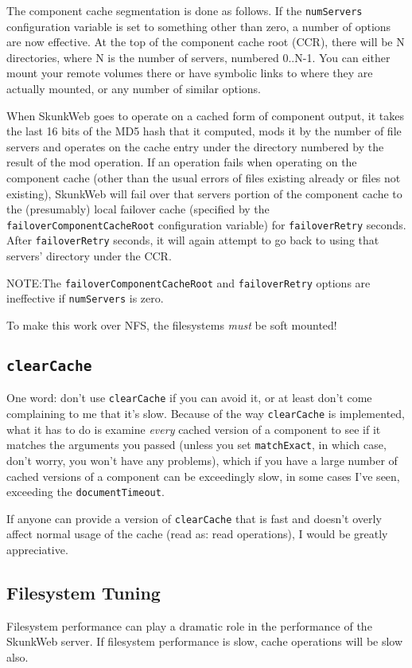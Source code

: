 \documentclass[titlepage]{manual}
\begin{document}
The component cache segmentation is done as follows. If the \texttt{numServers}
configuration variable is set to something other than zero, a number
of options are now effective. At the top of the component cache root
(CCR), there will be N directories, where N is the number of servers,
numbered 0..N-1. You can either mount your remote volumes there or
have symbolic links to where they are actually mounted, or any number
of similar options.
   
When SkunkWeb goes to operate on a cached form of component output, it
takes the last 16 bits of the MD5 hash that it computed, mods it by
the number of file servers and operates on the cache entry under the
directory numbered by the result of the mod operation. If an operation
fails when operating on the component cache (other than the usual
errors of files existing already or files not existing), SkunkWeb will
fail over that servers portion of the component cache to the
(presumably) local failover cache (specified by the
\texttt{failoverComponentCacheRoot} configuration variable) for
\texttt{failoverRetry} seconds. After \texttt{failoverRetry} seconds,
it will again attempt to go back to using that servers' directory
under the CCR.
   
   NOTE:The \texttt{failoverComponentCacheRoot} and
   \texttt{failoverRetry} options are ineffective if
   \texttt{numServers} is zero.

To make this work over NFS, the filesystems \emph{must} be soft mounted!

\subsection{\texttt{clearCache}}
\label{clearCache}
One word: don't use \texttt{clearCache} if you can avoid it, or at
least don't come complaining to me that it's slow.  Because of the way
\texttt{clearCache} is implemented, what it has to do is examine
\emph{every} cached version of a component to see if it matches the
arguments you passed (unless you set \texttt{matchExact}, in which
case, don't worry, you won't have any problems), which if you have a
large number of cached versions of a component can be exceedingly
slow, in some cases I've seen, exceeding the \texttt{documentTimeout}.

If anyone can provide a version of \texttt{clearCache} that is fast
and doesn't overly affect normal usage of the cache (read as: read
operations), I would be greatly appreciative.

\subsection{Filesystem Tuning}
Filesystem performance can play a dramatic role in the performance of
the SkunkWeb server.  If filesystem performance is slow, cache operations
will be slow also.
\end{document}
